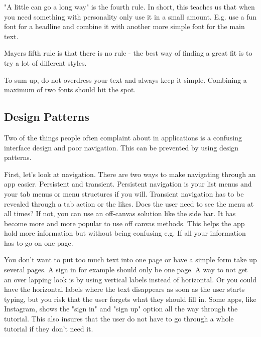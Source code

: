 "A little can go a long way" is the fourth rule. In short, this teaches us that when you need something with personality only use it in a small amount. E.g. use a fun font for a headline and combine it with another more simple font for the main text. 

Mayers fifth rule is that there is no rule - the best way of finding a great fit is to try a lot of different styles. \cite{Font}

To sum up, do not overdress your text and always keep it simple. Combining a maximum of two fonts should hit the spot.\cite{TypeComb} %

\subsection{Design Patterns}
Two of the things people often complaint about in applications is a confusing interface design and poor navigation. \cite{Pattern} This can be prevented by using design patterns. 

First, let's look at navigation. There are two ways to make navigating through an app easier. Persistent and transient. Persistent navigation is your list menus and your tab menus or menu structures if you will. Transient navigation has to be revealed through a tab action or the likes.\cite{Pattern}
Does the user need to see the menu at all times? If not, you can use an off-canvas solution like the side bar. 
It has become more and more popular to use off canvas methods. \cite{Pattern} This helps the app hold more information but without being confusing e.g. If all your information has to go on one page. %

You don't want to put too much text into one page or have a simple form take up several pages. A sign in for example should only be one page. A way to not get an over lapping look is by using vertical labels instead of horizontal. \cite{Pattern} Or you could have the horizontal labels where the text disappears as soon as the user starts typing, but you risk that the user forgets what they should fill in.\cite{Pattern} %
Some apps, like Instagram, shows the "sign in" and "sign up" option all the way through the tutorial. This also insures that the user do not have to go through a whole tutorial if they don't need it. 

